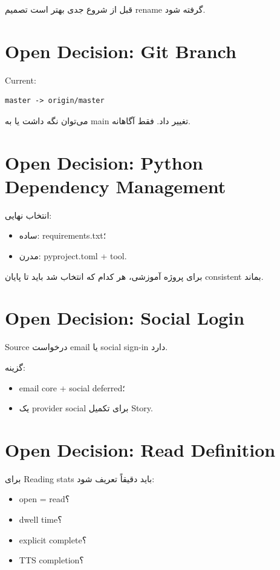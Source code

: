قبل از شروع جدی بهتر است تصمیم rename گرفته شود.

\section{Open Decision: Git Branch}

Current:
\begin{latin}
\begin{lstlisting}
master -> origin/master
\end{lstlisting}
\end{latin}

می‌توان نگه داشت یا به main تغییر داد. فقط آگاهانه.

\section{Open Decision: Python Dependency Management}

انتخاب نهایی:
\begin{itemize}
  \item ساده: requirements.txt؛
  \item مدرن: pyproject.toml + tool.
\end{itemize}

برای پروژه آموزشی، هر کدام که انتخاب شد باید تا پایان consistent بماند.

\section{Open Decision: Social Login}

Source درخواست email یا social sign-in دارد.

گزینه:
\begin{itemize}
  \item email core + social deferred؛
  \item یک provider social برای تکمیل Story.
\end{itemize}

\section{Open Decision: Read Definition}

برای Reading stats باید دقیقاً تعریف شود:
\begin{itemize}
  \item open = read؟
  \item dwell time؟
  \item explicit complete؟
  \item TTS completion؟
\end{itemize}

